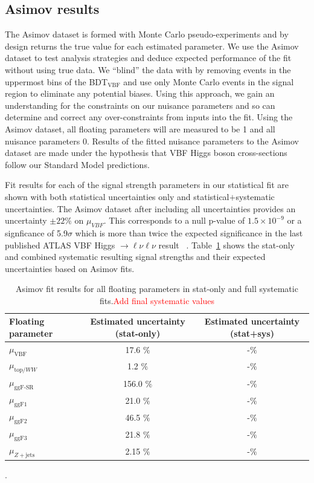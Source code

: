 \subsection{Asimov results}
The Asimov dataset is formed with Monte Carlo pseudo-experiments and by design returns the true value for each estimated parameter. We use the Asimov dataset to test analysis strategies and deduce expected performance of the fit without using true data. We ``blind'' the data with by removing events in the uppermost bins of the BDT$_{\text{VBF}}$ and use only Monte Carlo events in the signal region to eliminate any potential biases. Using this approach, we gain an understanding for the constraints on our nuisance parameters and so can determine and correct any over-constraints from inputs into the fit. Using the Asimov dataset, all floating parameters will are measured to be 1 and all nuisance parameters 0. Results of the fitted nuisance parameters to the Asimov dataset are made under the hypothesis that VBF Higgs boson cross-sections follow our Standard Model predictions. 

Fit results for each of the signal strength parameters in our statistical fit are shown with both statistical uncertainties only and statistical$+$systematic uncertainties. The Asimov dataset after including all uncertainties provides an uncertainty $\pm22\%$ on $\mu_{VBF}$. This corresponds to a null p-value of $1.5\times10^{-9}$ or a signficance of 5.9$\sigma$ which is more than twice the expected significance in the last published ATLAS VBF Higgs $\rightarrow \ell\nu\ell\nu$ result ~\cite{Aaboud_2019}. Table~\ref{tab:muresults} shows the stat-only and combined systematic resulting signal strengths and their expected uncertainties based on Asimov fits. 

\begin{table}[!h]
  \begin{center}
    \begin{tabular}{l|c|c|}
       Floating parameter & Estimated uncertainty (stat-only)    & Estimated uncertainty (stat+sys) \\
      \hline
       $\mu_{\text{VBF}}$ & 17.6 $\%$ & -$\%$ \\
       $\mu_{\text{top/}WW}$ & 1.2 $\%$ & -$\%$\\
       $\mu_{\text{ggF-SR}}$ & 156.0 $\%$ & -$\%$ \\
       $\mu_{\text{ggF1}}$ & 21.0 $\%$ & -$\%$ \\
       $\mu_{\text{ggF2}}$ & 46.5 $\%$ & -$\%$ \\
       $\mu_{\text{ggF3}}$ & 21.8 $\%$ & -$\%$ \\
       $\mu_{Z+\text{jets}}$ & 2.15 $\%$ & -$\%$ \\
    \end{tabular}
    \caption{Asimov fit results for all floating parameters in stat-only and full systematic fits.\textcolor{red}{Add final systematic values}}.
    \label{tab:muresults}
  \end{center}
\end{table}

